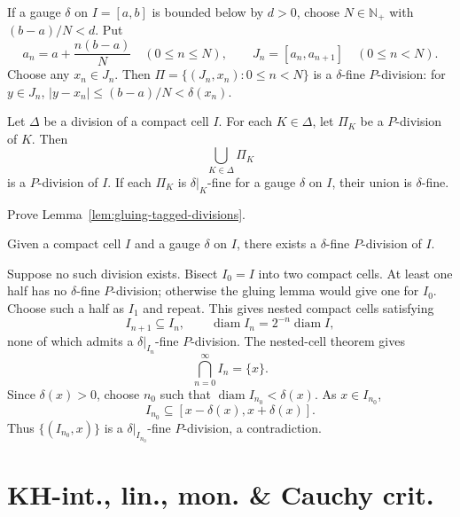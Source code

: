 \begin{exampleenv}
If a gauge $\delta$ on $I=[a,b]$ is bounded below by $d>0$, choose
$N\in\mathbb N_+$ with $(b-a)/N<d$. Put
\[
    a_n=a+\frac{n(b-a)}N\quad(0\le n\le N),
    \qquad J_n=[a_n,a_{n+1}]\quad(0\le n<N).
\]
Choose any $x_n\in J_n$. Then
$\Pi=\{(J_n,x_n):0\le n<N\}$ is a $\delta$-fine $P$-division:
for $y\in J_n$, $|y-x_n|\le(b-a)/N<\delta(x_n)$.
\end{exampleenv}

\begin{lemmaenv}\label{lem:gluing-tagged-divisions}
Let $\Delta$ be a division of a compact cell $I$. For each $K\in\Delta$,
let $\Pi_K$ be a $P$-division of $K$. Then
\[
    \bigcup_{K\in\Delta}\Pi_K
\]
is a $P$-division of $I$. If each $\Pi_K$ is $\delta|_K$-fine for a gauge
$\delta$ on $I$, their union is $\delta$-fine.
\end{lemmaenv}

\begin{exerciseenv}
Prove Lemma~\ref{lem:gluing-tagged-divisions}.
\end{exerciseenv}

\begin{theoremenv}[Cousin]\label{thm:cousin}
Given a compact cell $I$ and a gauge $\delta$ on $I$, there exists a
$\delta$-fine $P$-division of $I$.
\end{theoremenv}

\begin{proofenv}
Suppose no such division exists. Bisect $I_0=I$ into two compact cells.
At least one half has no $\delta$-fine $P$-division; otherwise the gluing
lemma would give one for $I_0$. Choose such a half as $I_1$ and repeat.
This gives nested compact cells satisfying
\[
    I_{n+1}\subseteq I_n,\qquad
    \operatorname{diam}I_n=2^{-n}\operatorname{diam}I,
\]
none of which admits a $\delta|_{I_n}$-fine $P$-division.
The nested-cell theorem gives
\[
    \bigcap_{n=0}^{\infty}I_n=\{x\}.
\]
Since $\delta(x)>0$, choose $n_0$ such that
$\operatorname{diam}I_{n_0}<\delta(x)$. As $x\in I_{n_0}$,
\[
    I_{n_0}\subseteq[x-\delta(x),x+\delta(x)].
\]
Thus $\{(I_{n_0},x)\}$ is a $\delta|_{I_{n_0}}$-fine $P$-division,
a contradiction.
\end{proofenv}


\section{KH-int., lin., mon. \& Cauchy crit.}


